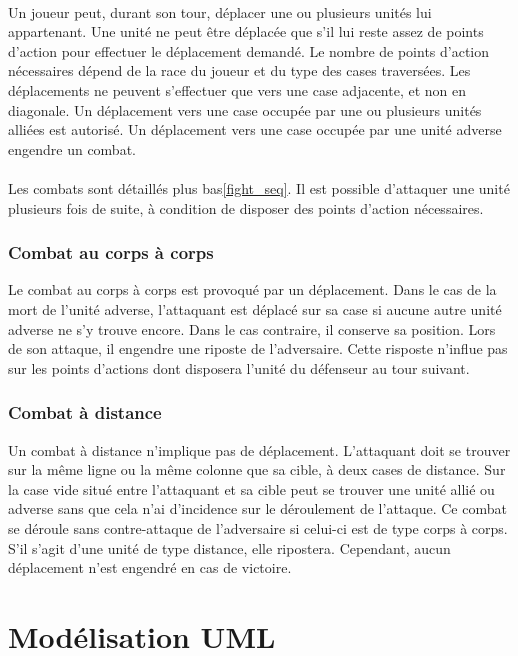 \documentclass[a4paper]{article}
\begin{document}
\paragraph{}
Un joueur peut, durant son tour, déplacer une ou plusieurs unités lui appartenant. Une unité ne peut être déplacée que s'il lui reste assez de points d'action pour effectuer le déplacement demandé. Le nombre de points d'action nécessaires dépend de la race du joueur et du type des cases traversées. Les déplacements ne peuvent s'effectuer que vers une case adjacente, et non en diagonale. Un déplacement vers une case occupée par une ou plusieurs unités alliées est autorisé. Un déplacement vers une case occupée par une unité adverse engendre un combat.

\paragraph{}
Les combats sont détaillés plus bas\ref{fight_seq}. Il est possible d'attaquer une unité plusieurs fois de suite, à condition de disposer des points d'action nécessaires.

\subsubsection{Combat au corps à corps}
Le combat au corps à corps est provoqué par un déplacement. Dans le cas de la mort de l'unité adverse, l'attaquant est déplacé sur sa case si aucune autre unité adverse ne s'y trouve encore. Dans le cas contraire, il conserve sa position.
Lors de son attaque, il engendre une riposte de l'adversaire. Cette risposte n'influe pas sur les points d'actions dont disposera l'unité du défenseur au tour suivant.
\subsubsection{Combat à distance}
Un combat à distance n'implique pas de déplacement. L'attaquant doit se trouver sur la même ligne ou la même colonne que sa cible, à deux cases de distance. Sur la case vide situé entre l'attaquant et sa cible peut se trouver une unité allié ou adverse sans que cela n'ai d'incidence sur le déroulement de l'attaque.
Ce combat se déroule sans contre-attaque de l'adversaire si celui-ci est de type corps à corps. S'il s'agit d'une unité de type distance, elle ripostera. Cependant, aucun déplacement n'est engendré en cas de victoire.
\section{Modélisation UML}
\end{document}
